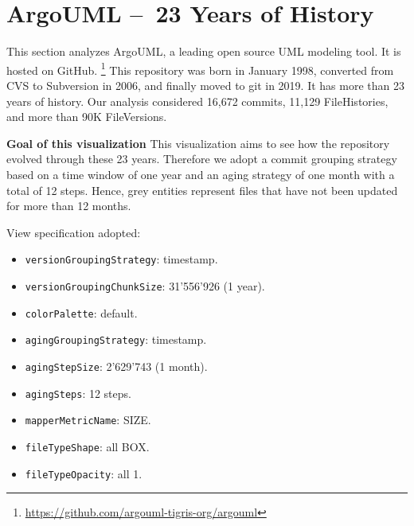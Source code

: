\section{ArgoUML – 23 Years of History}
This section analyzes ArgoUML, a leading open source UML modeling tool. 
It is hosted on GitHub. \footnote{\url{https://github.com/argouml-tigris-org/argouml}}
This repository was born in January 1998, converted from CVS to Subversion in 2006, and finally moved to git in 2019.
It has more than 23 years of history. 
Our analysis considered 16,672 commits, 11,129 FileHistories, and more than 90K FileVersions. 

\bigbreak
\label{subsec:view4}
\textbf{Goal of this visualization}
This visualization aims to see how the repository evolved through these 23 years. Therefore we adopt a commit grouping strategy based on a time window of one year and an aging strategy of one month with a total of 12 steps. Hence, grey entities represent files that have not been updated for more than 12 months. 


View specification adopted: 
\begin{itemize}
    \item \texttt{versionGroupingStrategy}: timestamp.
    \item \texttt{versionGroupingChunkSize}: 31'556'926 (1 year). 
    \item \texttt{colorPalette}: default.
    \item \texttt{agingGroupingStrategy}: timestamp.
    \item \texttt{agingStepSize}: 2'629'743 (1 month).
    \item \texttt{agingSteps}: 12 steps.
    \item \texttt{mapperMetricName}: SIZE. 
    \item \texttt{fileTypeShape}: all BOX. 
    \item \texttt{fileTypeOpacity}: all 1. 
\end{itemize}

